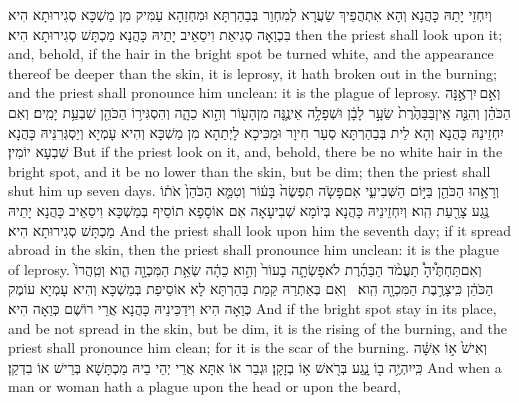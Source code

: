 {וְיִחְזֵי יָתַהּ כָּהֲנָא וְהָא אִתְהֲפֵיךְ שַׂעֲרָא לְמִחְוַר בְּבַהַרְתָּא וּמִחְזַהָא עַמִּיק מִן מַשְׁכָּא סְגִירוּתָא הִיא בִּכְוַאָה סְגִיאַת וִיסַאֵיב יָתֵיהּ כָּהֲנָא מַכְתָּשׁ סְגִירוּתָא הִיא׃}
{then the priest shall look upon it; and, behold, if the hair in the bright spot be turned white, and the appearance thereof be deeper than the skin, it is leprosy, it hath broken out in the burning; and the priest shall pronounce him unclean: it is the plague of leprosy.}{}
{וְאִ֣ם \legarmeh  יִרְאֶ֣נָּה הַכֹּהֵ֗ן וְהִנֵּ֤ה אֵֽין\maqqaf בַּבַּהֶ֙רֶת֙ שֵׂעָ֣ר לָבָ֔ן וּשְׁפָלָ֥ה אֵינֶ֛נָּה מִן\maqqaf הָע֖וֹר וְהִ֣וא כֵהָ֑ה וְהִסְגִּיר֥וֹ הַכֹּהֵ֖ן שִׁבְעַ֥ת יָמִֽים׃}
{וְאִם יִחְזֵינַהּ כָּהֲנָא וְהָא לֵית בְּבַהַרְתָּא סְעַר חִיוָר וּמַכִּיכָא לָיְתַהָא מִן מַשְׁכָּא וְהִיא עָמְיָא וְיַסְגְּרִנֵּיהּ כָּהֲנָא שִׁבְעָא יוֹמִין׃}
{But if the priest look on it, and, behold, there be no white hair in the bright spot, and it be no lower than the skin, but be dim; then the priest shall shut him up seven days.}{}
{וְרָאָ֥הוּ הַכֹּהֵ֖ן בַּיּ֣וֹם הַשְּׁבִיעִ֑י אִם\maqqaf פָּשֹׂ֤ה תִפְשֶׂה֙ בָּע֔וֹר וְטִמֵּ֤א הַכֹּהֵן֙ אֹת֔וֹ נֶ֥גַע צָרַ֖עַת הִֽוא׃}
{וְיִחְזֵינֵיהּ כָּהֲנָא בְּיוֹמָא שְׁבִיעָאָה אִם אוֹסָפָא תוֹסֵיף בְּמַשְׁכָּא וִיסַאֵיב כָּהֲנָא יָתֵיהּ מַכְתָּשׁ סְגִירוּתָא הִיא׃}
{And the priest shall look upon him the seventh day; if it spread abroad in the skin, then the priest shall pronounce him unclean: it is the plague of leprosy.}{}
{וְאִם\maqqaf תַּחְתֶּ֩יהָ֩ תַעֲמֹ֨ד הַבַּהֶ֜רֶת לֹא\maqqaf פָשְׂתָ֤ה בָעוֹר֙ וְהִ֣וא כֵהָ֔ה שְׂאֵ֥ת הַמִּכְוָ֖ה הִ֑וא וְטִֽהֲרוֹ֙ הַכֹּהֵ֔ן כִּֽי\maqqaf צָרֶ֥בֶת הַמִּכְוָ֖ה הִֽוא׃ \petucha }
{וְאִם בְּאַתְרַהּ קַמַת בַּהַרְתָּא לָא אוֹסֵיפַת בְּמַשְׁכָּא וְהִיא עָמְיָא עוֹמֶק כְּוַאָה הִיא וִידַכֵּינֵיהּ כָּהֲנָא אֲרֵי רוֹשֶׁם כְּוַאָה הִיא׃}
{And if the bright spot stay in its place, and be not spread in the skin, but be dim, it is the rising of the burning, and the priest shall pronounce him clean; for it is the scar of the burning.}{}
{וְאִישׁ֙ א֣וֹ אִשָּׁ֔ה כִּֽי\maqqaf יִהְיֶ֥ה ב֖וֹ נָ֑גַע בְּרֹ֖אשׁ א֥וֹ בְזָקָֽן׃}
{וּגְבַר אוֹ אִתָּא אֲרֵי יְהֵי בֵיהּ מַכְתָּשָׁא בְּרֵישׁ אוֹ בִדְקַן׃}
{And when a man or woman hath a plague upon the head or upon the beard,}{}
